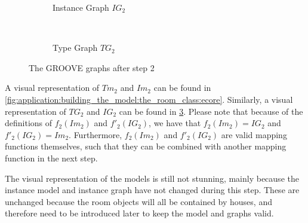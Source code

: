 \begin{figure}[p]
    \centering
    \begin{subfigure}{0.98\textwidth}
        \centering
        
        \caption{Instance Graph $IG_2$}
        \label{fig:application:building_the_model:the_room_class:groove:instance_graph}
    \end{subfigure}
    \\
    \begin{subfigure}{0.98\textwidth}
        \centering
        
        \caption{Type Graph $TG_2$}
        \label{fig:application:building_the_model:the_room_class:groove:type_graph}
    \end{subfigure}
    \caption{The GROOVE graphs after step 2}
    \label{fig:application:building_the_model:the_room_class:groove}
\end{figure}

A visual representation of $Tm_2$ and $Im_2$ can be found in \cref{fig:application:building_the_model:the_room_class:ecore}. Similarly, a visual representation of $TG_2$ and $IG_2$ can be found in \cref{fig:application:building_the_model:the_room_class:groove}. Please note that because of the definitions of $f_2(Im_2)$ and $f'_2(IG_2)$, we have that $f_2(Im_2) = IG_2$ and $f'_2(IG_2) = Im_2$. Furthermore, $f_2(Im_2)$ and $f'_2(IG_2)$ are valid mapping functions themselves, such that they can be combined with another mapping function in the next step.

The visual representation of the models is still not stunning, mainly because the instance model and instance graph have not changed during this step. These are unchanged because the room objects will all be contained by houses, and therefore need to be introduced later to keep the model and graphs valid.

\afterpage{\FloatBarrier}